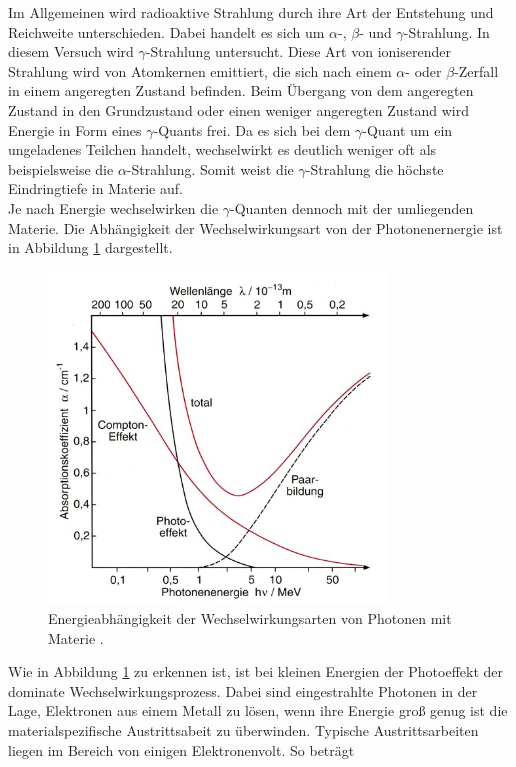 Im Allgemeinen wird radioaktive Strahlung durch ihre Art der Entstehung und Reichweite unterschieden.
Dabei handelt es sich um $\alpha$-, $\beta$- und $\gamma$-Strahlung. In diesem Versuch wird $\gamma$-Strahlung
untersucht. Diese Art von ioniserender Strahlung wird von Atomkernen emittiert, die sich nach einem $\alpha$- oder
$\beta$-Zerfall in einem angeregten Zustand befinden. Beim Übergang von dem angeregten Zustand in den Grundzustand oder einen
weniger angeregten Zustand wird Energie in Form eines $\gamma$-Quants frei. Da es sich bei dem $\gamma$-Quant um ein
ungeladenes Teilchen handelt, wechselwirkt es deutlich weniger oft als beispielsweise die $\alpha$-Strahlung. Somit weist die
$\gamma$-Strahlung die höchste Eindringtiefe in Materie auf. \\
Je nach Energie wechselwirken die $\gamma$-Quanten dennoch mit der umliegenden Materie.
Die Abhängigkeit der Wechselwirkungsart von der Photonenernergie ist in Abbildung \ref{fig:WW}
dargestellt.
\begin{figure}[H]
    \centering
    \includegraphics[width=0.8\textwidth]{WW.png}
    \caption{Energieabhängigkeit der Wechselwirkungsarten von Photonen mit Materie \cite{WW}.}
    \label{fig:WW}
\end{figure} \noindent
Wie in Abbildung \ref{fig:WW} zu erkennen ist, ist bei kleinen Energien der Photoeffekt der
dominate Wechselwirkungsprozess. Dabei sind eingestrahlte Photonen in der Lage, Elektronen aus
einem Metall zu lösen, wenn ihre Energie groß genug ist die materialspezifische Austrittsabeit
zu überwinden. Typische Austrittsarbeiten liegen im Bereich von einigen Elektronenvolt. So beträgt
